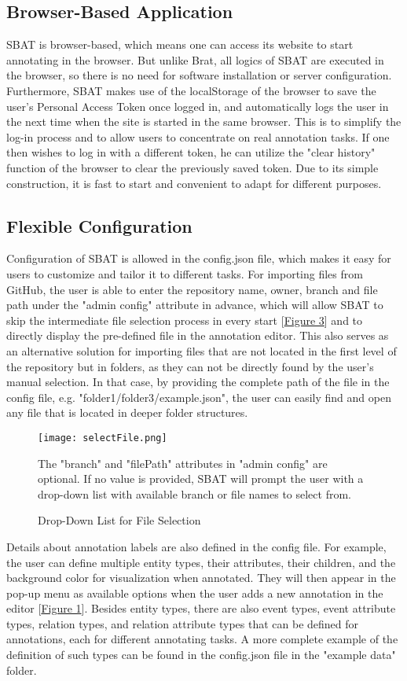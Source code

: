 \documentclass[12ptm a4paper]{article}
\begin{document}
\subsection{Browser-Based Application}
SBAT is browser-based, which means one can access its website to start annotating in the browser. But unlike Brat, all logics of SBAT are executed in the browser, so there is no need for software installation or server configuration. Furthermore, SBAT makes use of the localStorage of the browser to save the user's Personal Access Token once logged in, and automatically logs the user in the next time when the site is started in the same browser. This is to simplify the log-in process and to allow users to concentrate on real annotation tasks. If one then wishes to log in with a different token, he can utilize the "clear history" function of the browser to clear the previously saved token. Due to its simple construction, it is fast to start and convenient to adapt for different purposes.

\subsection{Flexible Configuration}
Configuration of SBAT is allowed in the config.json file, which makes it easy for users to customize and tailor it to different tasks. For importing files from GitHub, the user is able to enter the repository name, owner, branch and file path under the "admin config" attribute in advance, which will allow SBAT to skip the intermediate file selection process in every start [\hyperref[figure3]{Figure 3}] and to directly display the pre-defined file in the annotation editor. This also serves as an alternative solution for importing files that are not located in the first level of the repository but in folders, as they can not be directly found by the user's manual selection. In that case, by providing the complete path of the file in the config file, e.g. "folder1/folder3/example.json", the user can easily find and open any file that is located in deeper folder structures. \\
\begin{figure}[H]
{\centering
\texttt{[image: selectFile.png]}
\label{figure3}
\caption{Drop-Down List for File Selection}
}
{\scriptsize The "branch" and "filePath" attributes in "admin config" are optional. If no value is provided, SBAT will prompt the user with a drop-down list with available branch or file names to select from.\par}
\end{figure}
Details about annotation labels are also defined in the config file. For example, the user can define multiple entity types, their attributes, their children, and the background color for visualization when annotated. They will then appear in the pop-up menu as available options when the user adds a new annotation in the editor [\hyperref[figure1]{Figure 1}]. Besides entity types, there are also event types, event attribute types, relation types, and relation attribute types that can be defined for annotations, each for different annotating tasks.  A more complete example of the definition of such types can be found in the config.json file in the "example data" folder.
\end{document}
